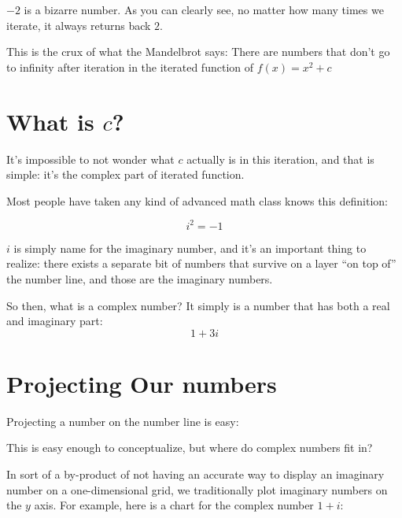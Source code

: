 \documentclass{article}
\begin{document}
$-2$ is a bizarre number.  As you can clearly see, no matter how many times we iterate, it always returns back $2$.

This is the crux of what the Mandelbrot says: There are numbers that don't go to infinity after iteration in the iterated function of $f(x) = x^2 + c$

\section{What is $c$?}
It's impossible to not wonder what $c$ actually is in this iteration, and that is simple: it's the complex part of iterated function.

Most people have taken any kind of advanced math class knows this definition:

$$ i^2 = -1$$

$i$ is simply name for the imaginary number, and it's an important thing to realize: there exists a separate bit of numbers that survive on a layer ``on top of'' the number line, and those are the imaginary numbers.

So then, what is a complex number?  It simply is a number that has both a real and imaginary part:
$$ 1 + 3i$$


\section{Projecting Our numbers}
Projecting a number on the number line is easy:



This is easy enough to conceptualize, but where do complex numbers fit in?

In sort of a by-product of not having an accurate way to display an imaginary number on a one-dimensional grid, we traditionally plot imaginary numbers on the $y$ axis. For example, here is a chart for the complex number $1 + i$:
\end{document}
